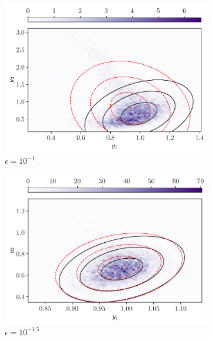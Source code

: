\begin{figure}
	\begin{center}
		\begin{subfigure}{0.49\textwidth}
			\includegraphics[width=\textwidth]{chp04_paper_numerics/figures/rossby/hist_0.1.pdf}
			\caption{\(\epsilon = 10^{-1}\)}
			\label{fig:y_hists_a}
		\end{subfigure}
		\begin{subfigure}{0.49\textwidth}
			\includegraphics[width=\textwidth]{chp04_paper_numerics/figures/rossby/hist_0.03162277660168379.pdf}
			\caption{\(\epsilon = 10^{-1.5}\)}
			\label{fig:y_hists_b}
		\end{subfigure}
		\begin{subfigure}{0.49\textwidth}

\end{subfigure}
\end{center}
\end{figure}
